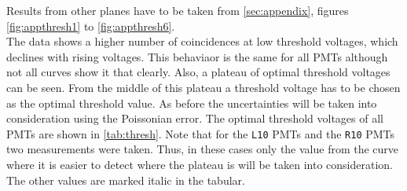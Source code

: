 Results from other planes have to be taken from \autoref{sec:appendix}, figures \autoref{fig:appthresh1} to \autoref{fig:appthresh6}.\\

The data shows a higher number of coincidences at low threshold voltages, which declines with rising voltages.
This behaviaor is the same for all PMTs although not all curves show it that clearly.  
Also, a plateau of optimal threshold voltages can be seen. From the middle of this plateau a threshold voltage 
has to be chosen as the optimal threshold value. As before the uncertainties will be taken 
into consideration using the Poissonian error. The optimal threshold voltages of all PMTs are shown in 
\autoref{tab:thresh}.
Note that for the \texttt{L10} PMTs and the \texttt{R10} PMTs two measurements 
were taken. Thus, in these cases only the value from the curve where it is easier to detect
where the plateau is will be taken into consideration.
The other values are marked italic in the tabular.
